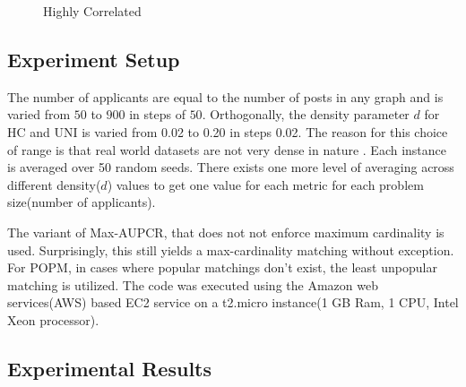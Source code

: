 \documentclass[letterpaper]{article} %
\begin{document}
\begin{figure}[t]
{}
\caption{Highly Correlated}
\end{figure}

\subsection{Experiment Setup}
The number of applicants are equal to the number of posts in any graph and is varied from $50$ to $900$ in steps of $50$. Orthogonally, the density parameter $d$ for HC and UNI is varied from 0.02 to 0.20 in steps 0.02. The reason for this choice of range is that real world datasets are not very dense in nature . Each instance is averaged over 50 random seeds. There exists one more level of averaging across different density($d$) values to get one value for each metric for each problem size(number of applicants).

The variant of Max-AUPCR, that does not not enforce maximum cardinality is used. Surprisingly, this still yields a max-cardinality matching without exception. For POPM, in cases where popular matchings don't exist, the least unpopular matching is utilized. The code was executed using the Amazon web services(AWS) based EC2 service on a t2.micro instance(1 GB Ram, 1 CPU, Intel Xeon processor).
\subsection{Experimental Results}
\end{document}
